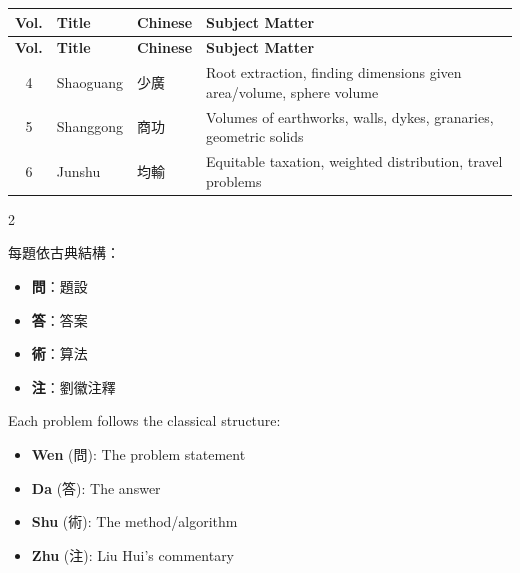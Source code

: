 \documentclass[10pt,a4paper]{article}
\begin{document}
\vspace{0.3cm}

\begin{center}
\begin{longtable}{|c|l|l|p{4.8cm}|}
\hline
\textbf{Vol.} & \textbf{Title} & \textbf{Chinese} & \textbf{Subject Matter} \\
\hline
\endfirsthead
\hline
\textbf{Vol.} & \textbf{Title} & \textbf{Chinese} & \textbf{Subject Matter} \\
\hline
\endhead
4 & Shaoguang & 少廣 & Root extraction, finding dimensions given area/volume, sphere volume \\
5 & Shanggong & 商功 & Volumes of earthworks, walls, dykes, granaries, geometric solids \\
6 & Junshu & 均輸 & Equitable taxation, weighted distribution, travel problems \\
\hline
\end{longtable}
\end{center}

\vspace{0.3cm}

\begin{paracol}{2}
\begin{leftcolumn*}
每題依古典結構：
\begin{itemize}[leftmargin=1.5em,topsep=0pt]
  \item \textbf{問}：題設
  \item \textbf{答}：答案
  \item \textbf{術}：算法
  \item \textbf{注}：劉徽注釋
\end{itemize}
\end{leftcolumn*}

\begin{rightcolumn*}
Each problem follows the classical structure:
\begin{itemize}[leftmargin=1.5em,topsep=0pt]
  \item \textbf{Wen} (問): The problem statement
  \item \textbf{Da} (答): The answer
  \item \textbf{Shu} (術): The method/algorithm
  \item \textbf{Zhu} (注): Liu Hui's commentary
\end{itemize}
\end{rightcolumn*}
\end{paracol}

\newpage

\end{document}
